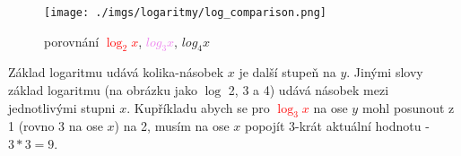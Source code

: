 \documentclass[a4paper,11pt]{article}
\begin{document}
{
    \begin{figure}[ht]
        \texttt{[image: ./imgs/logaritmy/log\_comparison.png]}
        \caption{
            porovnání \textcolor{red}{$\log_2 x$}, \textcolor{violet}{$log_3 x$}, $log_4 x$\\
        }
    \end{figure}

    Základ logaritmu udává kolika-násobek $x$ je další stupeň na $y$. Jinými slovy
    základ logaritmu (na obrázku jako $\log$ 2, 3 a 4) udává násobek mezi jednotlivými
    stupni $x$. Kupříkladu abych se pro \textcolor{red}{$\log_3 x$} na ose $y$ mohl
    posunout z 1 (rovno 3 na ose $x$) na 2, musím na ose $x$ popojít 3-krát aktuální
    hodnotu - $3*3 = 9$.
}
\end{document}
